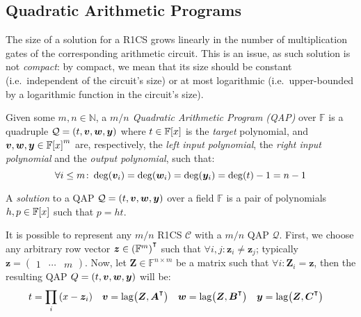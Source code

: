 \subsection{Quadratic Arithmetic Programs}
The size of a solution for a R1CS grows linearly in the number of multiplication gates of
the corresponding arithmetic circuit.
This is an issue, as such solution is not \emph{compact}: by compact, we mean that its size 
should be constant (i.e.\ independent of the circuit's size) or at most logarithmic (i.e.\ 
upper-bounded by a logarithmic function in the circuit's size).
\begin{definition}
	Given some \(m,n \in \mathbb{N}\), a
	\emph{\(m/n\) Quadratic Arithmetic Program (QAP)} over \(\mathbb{F}\) is a quadruple
	\(\mathcal{Q} = \left(t, \bm{v}, \bm{w}, \bm{y}\right)\) where \(t \in \extend{\mathbb{F}}{x}\) is 
  the \emph{target} polynomial, and \(\bm{v}, \bm{w}, \bm{y} \in \extend{\mathbb{F}}{x}^m\) are,
  respectively, the \emph{left input polynomial}, the \emph{right input polynomial} and the 
  \emph{output polynomial}, such that:
	\[\forall i \le m\colon \call{\deg}{\bm{v}_i} = \call{\deg}{\bm{w}_i} = \call{\deg}{\bm{y}_i} 
	= \call{\deg}{t} - 1 = n - 1\]
\end{definition}
\begin{definition}
	A \emph{solution} to a QAP \(\mathcal{Q} = \left(t, \bm{v}, \bm{w}, \bm{y}\right)\) over a field 
	\(\mathbb{F}\) is a pair of polynomials \(h,p \in \extend{\mathbb{F}}{x}\) such that \(p = ht\).
\end{definition}

It is possible to represent any \(m/n\) R1CS \(\mathcal{C}\) with a \(m/n\) QAP \(\mathcal{Q}\).
First, we choose any arbitrary row vector \(\bm{z} \in \Parens*{\mathbb{F}^m}^{\transpose}\) such 
that \(\forall i,j\colon \bm{z}_i \neq \bm{z}_j\); typically 
\(\bm{z} = {\begin{pmatrix}1 & \cdots & m\end{pmatrix}}\).
Now, let \(\bm{Z} \in \mathbb{F}^{n \times m}\) be a matrix such that
\(\forall i\colon \bm{Z}_i = \bm{z}\), then the resulting QAP 
\(Q = \left(t, \bm{v}, \bm{w}, \bm{y}\right)\) will be:
\begin{align*}
		& t = \prod_{i}{\Parens*{x - \bm{z}_i}} && 
		\bm{v} = \call{\lagrange}{\bm{Z}, \bm{A}^{\transpose}} &&
		\bm{w} = \call{\lagrange}{\bm{Z}, \bm{B}^{\transpose}} &&
		\bm{y} = \call{\lagrange}{\bm{Z}, \bm{C}^{\transpose}}
\end{align*}

